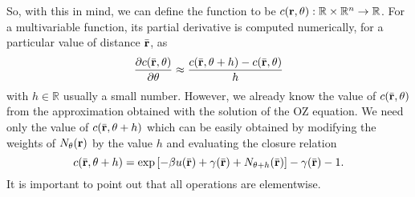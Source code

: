 So, with this in mind, we can define the function to be 
$c(\mathbf{r}, \theta) : \mathbb{R} \times \mathbb{R}^{n} \to \mathbb{R}$.
For a multivariable function, its partial derivative is computed numerically,
for a particular value of distance $\bar{\mathbf{r}}$, as
\begin{equation}
    \frac{\partial c(\bar{\mathbf{r}}, \theta)}{\partial \theta} \approx
    \frac{c(\bar{\mathbf{r}}, \theta + h) - c(\bar{\mathbf{r}}, \theta)}{h}
    \label{eq:num-diff}
\end{equation}
with $h \in \mathbb{R}$ usually a small number. However, we already know the value
of $c(\bar{\mathbf{r}}, \theta)$ from the approximation obtained with the solution of
the OZ equation. We need only the value of $c(\bar{\mathbf{r}}, \theta + h)$ which can
be easily obtained by modifying the weights of $N_{\theta}(\mathbf{r})$ by the value $h$ and evaluating
the closure relation
\[
    c(\bar{\mathbf{r}}, \theta + h) = \exp{\left[-\beta u(\bar{\mathbf{r}}) + \gamma(\bar{\mathbf{r}}) + N_{\theta + h}(\bar{\mathbf{r}})\right] - \gamma(\bar{\mathbf{r}}) - 1} .
\]
It is important to point out that all operations are elementwise.

